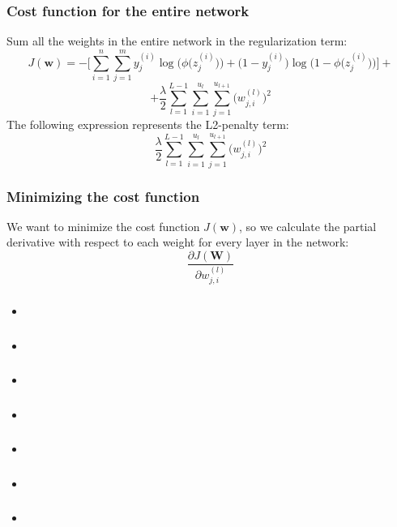 \documentclass{beamer}
\begin{document}
\begin{frame}
  \frametitle{Cost function for the entire network}
  Sum all the weights in the entire network in the regularization term:
  \[
  J(\mathbf{w}) = - \Bigg[ \sum_{i=1}^{n} \sum_{j=1}^{m} y_{j}^{(i)}  \log \bigg( \phi \Big( z_{j}^{(i)} \Big) \bigg) + \Big(1 - y_{j}^{(i)} \Big) \log  \bigg(1 - \phi \Big( z_{j}^{(i)} \Big)  \bigg) \Bigg] +
  \]
  \[
  + \frac{\lambda}{2} \sum_{l=1}^{L-1} \sum_{i=1}^{u_l} \sum_{j=1}^{u_{l+1}} \Big(w_{j, i}^{(l)}\Big)^2
  \]
  The following expression represents the L2-penalty term:
  \[
  \frac{\lambda}{2} \sum_{l=1}^{L-1} \sum_{i=1}^{u_l} \sum_{j=1}^{u_{l+1}} \Big(w_{j, i}^{(l)}\Big)^2
  \]
\end{frame}

\begin{frame}
  \frametitle{Minimizing the cost function}
  We want to minimize the cost function $J(\mathbf{w})$, so we calculate the partial derivative with respect to each weight for every layer in the network:
  \[
  \frac{\partial J(\mathbf{W})}{\partial w_{j, i}^{(l)}}
  \]
\end{frame}

\begin{frame}
  \frametitle{}
  \begin{itemize}
  \item
  \end{itemize}
\end{frame}

\begin{frame}
  \frametitle{}
  \begin{itemize}
  \item
  \end{itemize}
\end{frame}

\begin{frame}
  \frametitle{}
  \begin{itemize}
  \item
  \end{itemize}
\end{frame}

\begin{frame}
  \frametitle{}
  \begin{itemize}
  \item
  \end{itemize}
\end{frame}

\begin{frame}
  \frametitle{}
  \begin{itemize}
  \item
  \end{itemize}
\end{frame}

\begin{frame}
  \frametitle{}
  \begin{itemize}
  \item
  \end{itemize}
\end{frame}

\begin{frame}
  \frametitle{}
  \begin{itemize}
  \item
  \end{itemize}
\end{frame}
\end{document}
